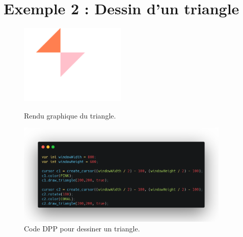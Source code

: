 \documentclass[12pt,a4paper]{report}
\begin{document}
\section{Exemple 2 : Dessin d'un triangle}
\begin{figure}[H]
    \centering
    \includegraphics[width=0.45\textwidth]{assets/render/draw_triangle.png}
    \caption{Rendu graphique du triangle.}
    \includegraphics[width=0.9\textwidth]{assets/code/draw_triangle_dpp.png}
    \caption{Code DPP pour dessiner un triangle.}
\end{figure}
\end{document}
